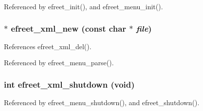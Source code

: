 Referenced by efreet\_\-init(), and efreet\_\-menu\_\-init().
\subsubsection[efreet\_\-xml\_\-new]{$\ast$ efreet\_\-xml\_\-new (const char $\ast$ {\em file})}\label{efreet__xml_8c_4d2285311849adcc65e6988fd99aa697}




References efreet\_\-xml\_\-del().

Referenced by efreet\_\-menu\_\-parse().
\subsubsection[efreet\_\-xml\_\-shutdown]{\setlength{\rightskip}{0pt plus 5cm}int efreet\_\-xml\_\-shutdown (void)}\label{efreet__xml_8c_b23f8e3a7d790c153a0612d54967e6a3}




Referenced by efreet\_\-menu\_\-shutdown(), and efreet\_\-shutdown().